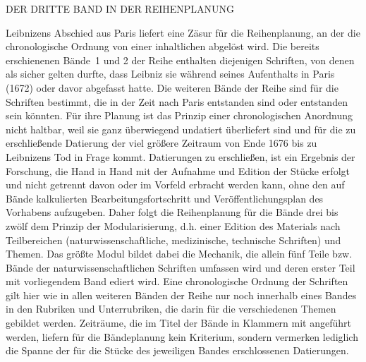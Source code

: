 %
\par\noindent
%
\par\noindent 
\par\vspace{6.0ex}
\noindent
\noindent\uppercase{Der dritte Band in der Reihenplanung}
\par
\vspace{1.0ex}
\noindent
Leibnizens Abschied aus Paris liefert eine Zäsur für die Reihenplanung, an der die chronologische Ordnung von einer inhaltlichen abgelöst wird. Die bereits erschienenen Bände~1 und 2 der Reihe enthalten diejenigen Schriften, von denen als sicher gelten durfte, dass Leibniz sie während seines Aufenthalts in Paris (1672) oder davor abgefasst hatte. 
Die weiteren Bände der Reihe sind für die Schriften bestimmt, die in der Zeit nach Paris entstanden sind oder entstanden sein könnten. 
Für ihre Planung ist das Prinzip einer chronologischen Anordnung nicht haltbar, weil sie ganz überwiegend undatiert überliefert sind und für die zu erschließende Datierung der viel größere Zeitraum von Ende 1676 bis zu Leibnizens Tod in Frage kommt. 
Datierungen zu erschließen, ist ein Ergebnis der Forschung, die Hand in Hand mit der Aufnahme und Edition der Stücke erfolgt und nicht getrennt davon oder im Vorfeld erbracht werden kann, ohne den auf Bände kalkulierten Bearbeitungsfortschritt und Veröffentlichungsplan des Vorhabens aufzugeben. 
Daher folgt die Reihenplanung für die Bände drei bis zwölf dem Prinzip der Modularisierung, d.h. einer Edition des Materials nach Teilbereichen (naturwissenschaftliche, medizinische, technische Schriften) und Themen. Das größte Modul bildet dabei die Mechanik, die allein fünf Teile bzw. Bände der naturwissenschaftlichen Schriften umfassen wird und deren erster Teil mit vorliegendem Band ediert wird. Eine chronologische Ordnung der Schriften gilt hier wie in allen weiteren Bänden der Reihe nur noch innerhalb eines Bandes in den Rubriken und Unterrubriken, die darin für die verschiedenen Themen gebildet werden. Zeiträume, die im Titel der Bände in Klammern mit angeführt werden, liefern für die Bändeplanung kein Kriterium, sondern vermerken lediglich die Spanne der für die Stücke des jeweiligen Bandes erschlossenen Datierungen. 
